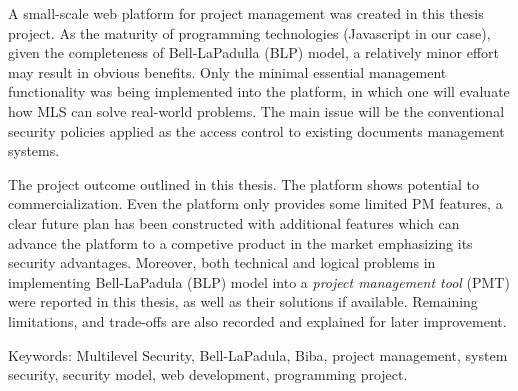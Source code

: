 A small-scale web platform for project management was created in this thesis project.
As the maturity of programming technologies (\eg Javascript in our case), given the completeness of Bell-LaPadulla (BLP) model, a relatively minor effort may result in obvious benefits.
Only the minimal essential management functionality was being implemented into the platform, in which one will evaluate how MLS can solve real-world problems.
The main issue will be the conventional security policies applied as the access control to existing documents management systems.

The project outcome outlined in this thesis.
The platform shows potential to commercialization.
Even the platform only provides some limited PM features, a clear future plan has been constructed with additional features which can advance the platform to a competive product in the market emphasizing its security advantages.
Moreover, both technical and logical problems in implementing Bell-LaPadula (BLP) model into a \emph{project management tool} (PMT) were reported in this thesis, as well as their solutions if available.
Remaining limitations, and trade-offs are also recorded and explained for later improvement.

\bigskip
Keywords: Multilevel Security, Bell-LaPadula, Biba, project management, system security, security model, web development, programming project.
\endgroup			

\vfill
